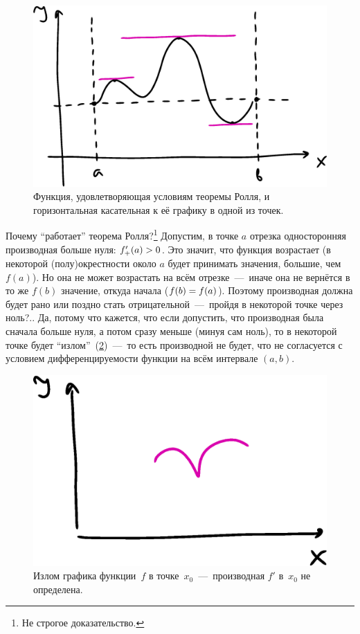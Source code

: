 \documentclass[a4paper,12pt]{article}
\begin{document}
  \begin{figure}
      \centering
      
      \includegraphics[width=0.8\linewidth]{images/roll}
      
      \caption{Функция, удовлетворяющая условиям теоремы Ролля, и горизонтальная касательная к её графику в одной из точек.}
      \label{fig:roll}
  \end{figure}

  Почему ``работает'' теорема Ролля?\footnote{
    Не строгое доказательство.
  }
  Допустим, в точке $a$ отрезка односторонняя производная больше нуля: $f'_+(a) \hm> 0$.
  Это значит, что функция возрастает (в некоторой (полу)окрестности около $a$ будет принимать значения, большие, чем $f(a)$).
  Но она не может возрастать на всём отрезке~---~иначе она не вернётся в то же $f(b)$ значение, откуда начала ($f(b) \hm= f(a)$).
  Поэтому производная должна будет рано или поздно стать отрицательной~---~пройдя в некоторой точке через ноль?..
  Да, потому что кажется, что если допустить, что производная была сначала больше нуля, а потом сразу меньше (минуя сам ноль), то в некоторой точке будет ``излом''~(\ref{fig:corner-point})~---~то есть производной не будет, что не согласуется с условием дифференцируемости функции на всём интервале $(a, b)$.

  \begin{figure}[ht]
      \centering
      
      \includegraphics[width=0.5\linewidth]{images/corner-point}
      
      \caption{Излом графика функции~$f$ в точке~$x_0$~---~производная $f'$ в~$x_0$ не определена.}
      \label{fig:corner-point}
  \end{figure}
\end{document}
